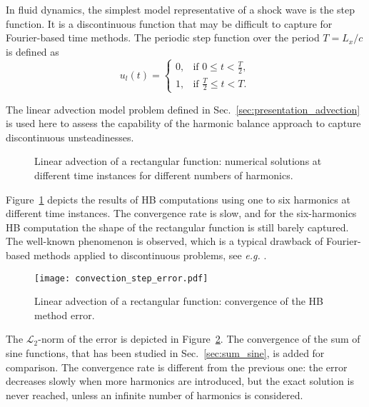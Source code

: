 
In fluid dynamics, the simplest model 
representative of a shock wave
is the step function. It is a discontinuous function
that may be difficult to capture for Fourier-based time methods.
The periodic step function over the period $T=L_x/c$ is defined as
\begin{equation}
    u_l(t) = 
    \begin{cases}
        0, & \text{if } 0 \leq t < \frac{T}{2}, \\
        1, & \text{if } \frac{T}{2} \leq t < T.
    \end{cases}
    \label{eq:inject_step}
\end{equation}

The linear advection model problem defined in 
Sec.~\ref{sec:presentation_advection} is used here to assess
the capability of the harmonic balance approach to capture
discontinuous unsteadinesses.

\begin{figure}[htp]
  \centering
  \caption{Linear advection of a rectangular function: 
  numerical solutions at different time instances for different numbers of harmonics.}
  \label{fig:inj_step_results}
\end{figure}
Figure~\ref{fig:inj_step_results} depicts the results of HB computations
using one to six harmonics at different time instances. The convergence rate 
is slow, and for the six-harmonics HB computation the
shape of the rectangular function is still barely captured. 
The well-known \citet{Gibbs1899}
phenomenon is observed, which is a typical drawback 
of Fourier-based methods applied to discontinuous problems, 
see \emph{e.g.} \citet{Canuto2006}.

\begin{figure}[htp]
  \centering
  \texttt{[image: convection\_step\_error.pdf]}
  \caption{Linear advection of a rectangular function: convergence of the HB method error.}
  \label{fig:conv_step}
\end{figure}
The $\mathcal{L}_2$-norm 
of the error is depicted in Figure~\ref{fig:conv_step}. 
The convergence of the sum of sine functions, 
that has been studied in Sec.~\ref{sec:sum_sine},
is added for comparison.
The convergence rate is different from the previous one: 
the error decreases slowly when more harmonics are introduced, 
but the exact solution is never reached, 
unless an infinite number of harmonics is considered.

